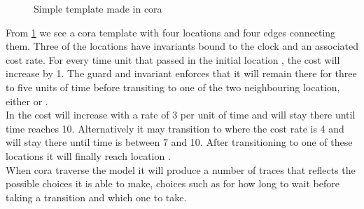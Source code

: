 \begin{figure}[H]
	\centering
	\caption{Simple template made in \gls{cora}}
	\label{fig:cora_eks}
\end{figure}
From \cref{fig:cora_eks} we see a \gls{cora} template with four locations and four edges connecting them. 
Three of the locations have invariants bound to the clock  and an associated cost rate. 
For every time unit that passed in the initial location , the cost will increase by 1. 
The guard and invariant enforces that it will remain there for three to five units of time before transiting to one of the two neighbouring location, either  or .\\ 
In  the cost will increase with a rate of 3 per unit of time and will stay there until time reaches 10. 
Alternatively it may transition to  where the cost rate is 4 and will stay there until time is between 7 and 10. 
After transitioning to one of these locations it will finally reach location . \\
When \gls{cora} traverse the model it will produce a number of traces that reflects the possible choices it is able to make, choices such as for how long to wait before taking a transition and which one to take.
